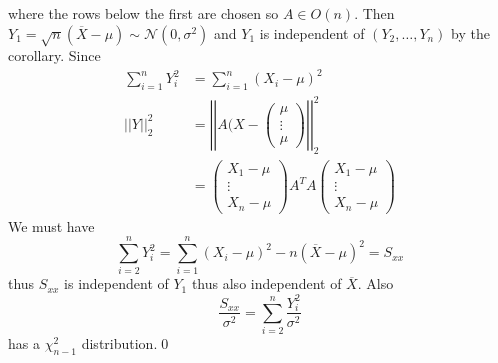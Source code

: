 \documentclass{article}
\begin{document}
where the rows below the first are chosen so $ A\in O(n) $.
Then $ Y_1 = \sqrt n(\overline X-\mu) \sim\mathcal N(0,\sigma^2) $ and $ Y_1 $ is independent of $ (Y_2,\dots, Y_n) $ by the corollary. Since
\begin{align*}
	\sum_{i=1}^n Y_i^2 &= \sum_{i=1}^n (X_i-\mu)^2 \\
	||Y||_2^2 &= \left|\left|A(X-\begin{pmatrix}
	  \mu \\
	  \vdots \\
	  \mu
	\end{pmatrix}\right|\right|^2_2 \\
		  &= \begin{pmatrix}
		    X_1-\mu \\
		    \vdots \\
		    X_n-\mu
		  \end{pmatrix}A^TA \begin{pmatrix}
		    X_1- \mu \\
		    \vdots \\
		    X_n-\mu
		  \end{pmatrix}
	\end{align*}
We must have
\[
	\sum_{i=2}^n Y_i^2 = \sum_{i=1}^n (X_i-\mu)^2 - n(\overline X-\mu)^2 = S_{xx}
\]
thus $ S_{xx} $ is independent of $ Y_1 $ thus also independent of $ \overline X $. Also
\[
	\frac{S_{xx}}{\sigma^2} = \sum_{i=2}^n \frac{Y_i^2}{\sigma^2}
\]
has a $ \chi_{n-1}^2 $ distribution.\qed
\end{document}
